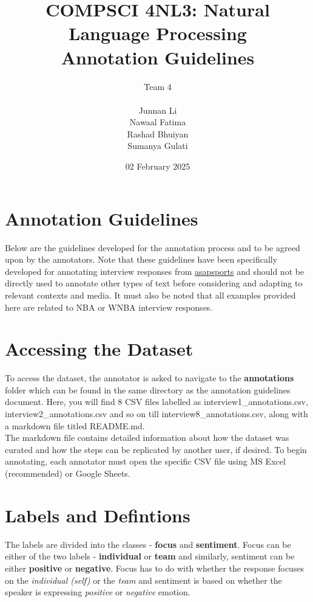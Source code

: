 \documentclass[titlepage]{article}
\title{COMPSCI 4NL3: Natural Language Processing\\
Annotation Guidelines}
\author{Team 4\\
\\ Junnan Li
\\ Nawaal Fatima
\\ Rashad Bhuiyan
\\ Sumanya Gulati}
\date{02 February 2025}
\begin{document}
\begin{titlepage}
  \maketitle
\end{titlepage}

\newpage

\section{Annotation Guidelines}
Below are the guidelines developed for the annotation process and to be agreed upon 
by the annotators. Note that these guidelines have been specifically developed for 
annotating interview responses from \href{https://asapsports.com/}{asapsports} and should not be directly used to
annotate other types of text before considering and adapting to relevant contexts and media. 
It must also be noted that all examples provided here are related to NBA or WNBA interview responses.

\section{Accessing the Dataset}
To access the dataset, the annotator is asked to navigate to the \textbf{annotations} folder which can be
found in the same directory as the annotation guidelines document. Here, you will find 8 CSV files labelled as
interview1\_annotations.csv, interview2\_annotations.csv and so on till interview8\_annotations.csv, along with a 
markdown file titled README.md. \\

The markdown file contains detailed information about how the dataset was curated and how the steps can be 
replicated by another user, if desired. To begin annotating, each annotator must open the specific CSV file using 
MS Excel (recommended) or Google Sheets.

\section{Labels and Defintions}
The labels are divided into the classes - \textbf{focus} and \textbf{sentiment}. Focus can be either of 
the two labels - \textbf{individual} or \textbf{team} and similarly, sentiment can be either \textbf{positive} or \textbf{negative}. 
Focus has to do with whether the response focuses on the \emph{individual (self)} or the \emph{team} and 
sentiment is based on whether the speaker is expressing \emph{positive} or \emph{negative} emotion.
\end{document}
